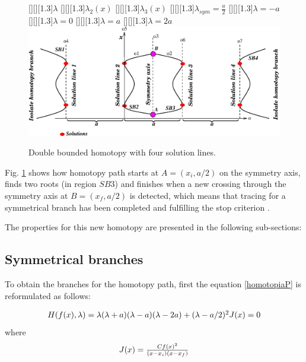 \documentclass{elex}
\begin{document}
\begin{figure}[tbp]
{\tiny  
\centerline{
[][][1.3]{$\lambda$}
[][][1.3]{$\lambda_2(x)$}
[][][1.3]{$\lambda_3(x)$}
[][][1.3]{$\lambda_{sym}=\frac{a}{2}$}
[][][1.3]{$\lambda=-a$}
[][][1.3]{$\lambda=0$}
[][][1.3]{$\lambda=a$}
[][][1.3]{$\lambda=2a$}
\centering
\includegraphics[scale=0.6]{yamamura/doblelineapoli.eps}}}
\caption{Double bounded homotopy with four solution lines.}
\label{doblehp}
\end{figure}

Fig. \ref{doblehp} shows how homotopy path starts at $A=(x_i,a/2)$ on the symmetry axis, finds two roots (in region $SB3$) and finishes when a new crossing through the symmetry axis at $B=(x_f,a/2)$ is detected, which means that tracing for a symmetrical branch has been completed and fulfilling the stop criterion \cite{homo_hk05}.


The properties for this new homotopy are presented in the following sub-sections:
\subsection{Symmetrical branches}

To obtain the branches for the homotopy path, first the equation \ref{homotopiaP} is reformulated as follows:

\begin{equation}
{%
\begin{array}{l}
H(f(x),\lambda )=\lambda(\lambda+a)(\lambda-a)(\lambda-2a)+(\lambda-a/2)^2 J(x)=0
\end{array}}
\label{homotopiaP1}
\end{equation}
where 
\begin{displaymath}
\begin{array}{l}
 J(x)= {Cf(x)^2 \over (x-x_i)(x-x_f)}
\end{array}
\end{displaymath}
\end{document}
